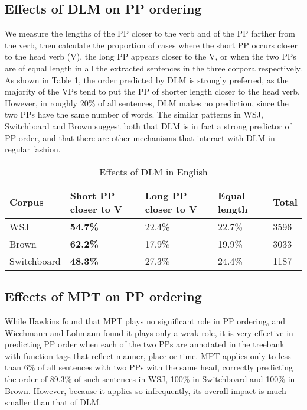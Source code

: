 \documentclass[11pt,letterpaper]{article}
\begin{document}
\subsection{Effects of DLM on PP ordering}

We measure the lengths of the PP closer to the verb and of the PP farther from the verb, then calculate the proportion of cases where the short PP occurs closer to the head verb (V), the long PP appears closer to the V, or when the two PPs are of equal length in all the extracted sentences in the three corpora respectively. As shown in Table 1, the order predicted by DLM is strongly preferred, as the majority of the VPs tend to put the PP of shorter length closer to the head verb. However, in roughly 20\% of all sentences, DLM makes no prediction, since the two PPs have the same number of words. The similar patterns in WSJ, Switchboard and Brown suggest both that DLM is in fact a strong predictor of PP order, and that there are other mechanisms that interact with DLM in regular fashion. 

\begin{table}[h!]
\small
\centering
				\begin{tabular}{|p{2cm}|p{1cm}|p{1cm}|p{1cm}|p{1cm}|}
		\hline 
		Corpus & \bf Short PP closer to V & Long PP closer to V & Equal length & Total \\ \hline
	WSJ & \bf 54.7\% & 22.4\% & 22.7\% & 3596 \\
	Brown & \bf 62.2\% & 17.9\% & 19.9\% & 3033 \\
	Switchboard & \bf 48.3\% & 27.3\% & 24.4\% & 1187 \\
	\hline
				\end{tabular}	
		\caption{Effects of DLM in English}
			\end{table}

\subsection{Effects of MPT on PP ordering}

While Hawkins  found that MPT plays no significant role in PP ordering, and Wiechmann and Lohmann  found it plays only a weak role, it is very effective in predicting PP order when each of the two PPs are annotated in the treebank with function tags that reflect manner, place or time. MPT applies only to less than 6\% of all sentences with two PPs with the same head, correctly predicting the order of 89.3\% of such sentences in WSJ, 100\% in Switchboard and 100\% in Brown. However, because it applies so infrequently, its overall impact is much smaller than that of DLM.
\end{document}
